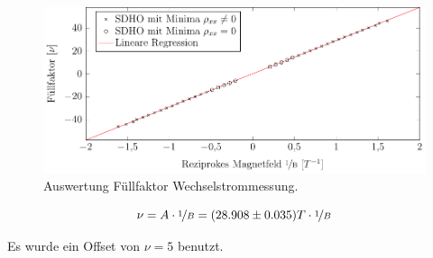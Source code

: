 \begin{figure}[h]
	\centering
	\includegraphics{graphs/ac/auswertung.pdf}
	\caption[Auswertung Füllfaktor Wechselstrommessung]{
		Auswertung Füllfaktor Wechselstrommessung.
	}
	\label{fig:ac_sdho_ausw}
\end{figure}

\begin{equation}
\nu= A\cdot \nicefrac{1}{B}=(28.908\pm 0.035)T \cdot \nicefrac{1}{B}
\end{equation}

Es wurde ein Offset von $\nu=5$ benutzt.